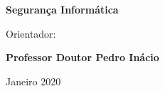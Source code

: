 \vspace{0.2cm}
\begin{center}
\begin{large}
\textbf{Segurança Informática}
\end{large}
\end{center}

\vspace{0,5cm}
\begin{center}
\begin{normalsize}
Orientador:
\end{normalsize}
\end{center}

\vspace{0.2cm}
\begin{center}
\begin{large}
\textbf{Professor Doutor Pedro Inácio}
\end{large}
\end{center}

\vspace{0.5cm}
\begin{center}
\begin{normalsize}
Janeiro 2020
\end{normalsize}
\end{center}
